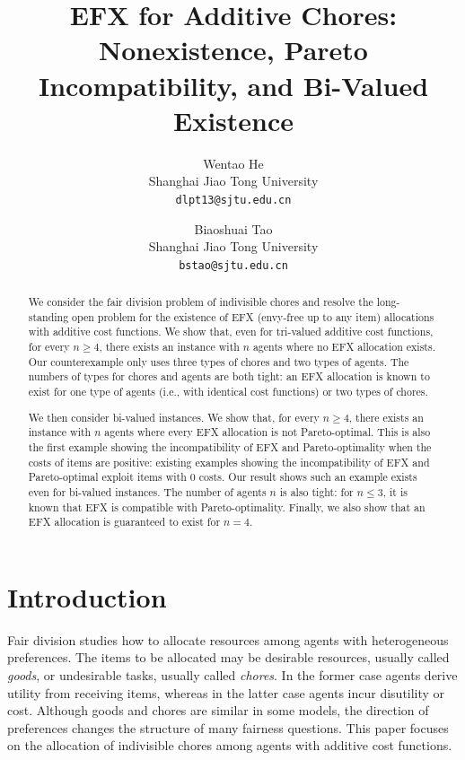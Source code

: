\documentclass{article}
\title{EFX for Additive Chores: Nonexistence, Pareto Incompatibility, and Bi-Valued Existence}
\author{%
  Wentao He \\
  Shanghai Jiao Tong University \\
  \texttt{dlpt13@sjtu.edu.cn} \\
  \and
  Biaoshuai Tao \\
  Shanghai Jiao Tong University \\
  \texttt{bstao@sjtu.edu.cn} \\
}
\date{}
\theoremstyle{definition}
\begin{document}
\maketitle

\begin{abstract}
    We consider the fair division problem of indivisible chores and resolve the long-standing open problem for the existence of EFX (envy-free up to any item) allocations with additive cost functions. We show that, even for tri-valued additive cost functions, for every $n\geq 4$, there exists an instance with $n$ agents where no EFX allocation exists. Our counterexample only uses three types of chores and two types of agents. The numbers of types for chores and agents are both tight: an EFX allocation is known to exist for one type of agents (i.e., with identical cost functions) or two types of chores.

    We then consider bi-valued instances. We show that, for every $n\geq 4$, there exists an instance with $n$ agents where every EFX allocation is not Pareto-optimal. This is also the first example showing the incompatibility of EFX and Pareto-optimality when the costs of items are positive: existing examples showing the incompatibility of EFX and Pareto-optimal exploit items with $0$ costs. Our result shows such an example exists even for bi-valued instances. The number of agents $n$ is also tight: for $n\leq 3$, it is known that EFX is compatible with Pareto-optimality. Finally, we also show that an EFX allocation is guaranteed to exist for $n=4$.
\end{abstract}


\section{Introduction}
\label{sec:intro}

Fair division studies how to allocate resources among agents with heterogeneous
preferences. 
The items to be allocated may be desirable resources, usually called
\emph{goods}, or undesirable tasks, usually called \emph{chores}. 
In the former
case agents derive utility from receiving items, whereas in the latter case agents
incur disutility or cost.  
Although goods and chores are similar in some
models, the direction of preferences changes the structure of many fairness
questions.  
This paper focuses on the allocation of indivisible chores among
agents with additive cost functions.
\end{document}
